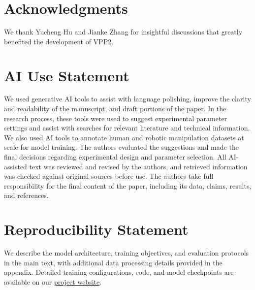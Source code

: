 \documentclass{article} %
\begin{document}




\newpage

\section*{Acknowledgments}
We thank Yucheng Hu and Jianke Zhang for insightful discussions that greatly benefited the development of VPP2.

\section*{AI Use Statement}
We used generative AI tools to assist with language polishing, improve the clarity and readability of the manuscript, and draft portions of the paper. In the research process, these tools were used to suggest experimental parameter settings and assist with searches for relevant literature and technical information. We also used AI tools to annotate human and robotic manipulation datasets at scale for model training. The authors evaluated the suggestions and made the final decisions regarding experimental design and parameter selection. All AI-assisted text was reviewed and revised by the authors, and retrieved information was checked against original sources before use. The authors take full responsibility for the final content of the paper, including its data, claims, results, and references.


\section*{Reproducibility Statement}
We describe the model architecture, training objectives, and evaluation protocols in the main text, with additional data processing details provided in the appendix. Detailed training configurations, code, and model checkpoints are available on our \href{https://robert-gyj.github.io/video-prediction-policy-2}{project website}.





\end{document}
